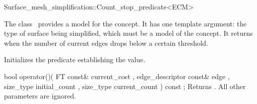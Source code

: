 

\begin{ccRefClass}{Surface_mesh_simplification::Count_stop_predicate<ECM>}


\ccDefinition

The class \ccRefName\ provides a model for the  concept.
It has one template argument: the type of surface being simplified,
which must be a model of the  concept.
It returns  when the number of current edges drops below a certain threshold.


\ccIsModel
{}

\ccCreation
{}  %

{Initializes the predicate establishing the  value.} 

\ccOperations

  \ccMethod
    {bool operator()( FT const&              current_cost
                    , edge_descriptor const& edge
                    , size_type              initial_count
                    , size_type              current_count
                    ) const ;
           }
  {Returns . All other parameters are ignored.}

\ccSeeAlso
{}

\end{ccRefClass}


